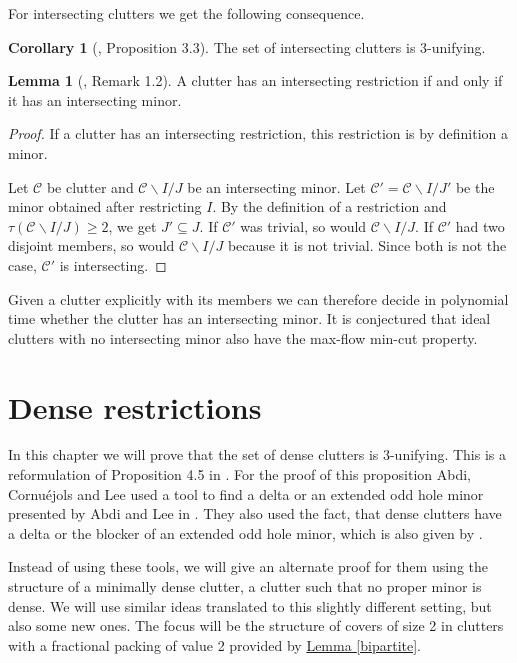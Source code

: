 \documentclass[a4paper, 12pt]{scrbook}
\theoremstyle{definition}
\newtheorem{corollary}[theorem]{Corollary}
\newtheorem{lemma}[theorem]{Lemma}
\begin{document}
   For intersecting clutters we get the following consequence.
   \begin{corollary}[\cite{restrictions}, Proposition 3.3]
       The set of intersecting clutters is 3-unifying.
   \end{corollary}

   \begin{lemma}[\cite{restrictions}, Remark 1.2]\label{intersectingminor}
       A clutter has an intersecting restriction if and only if it has an intersecting minor.
   \end{lemma}

  \begin{proof}
      If a clutter has an intersecting restriction, this restriction is by definition a minor.

      Let $\mathcal{C}$ be clutter and $\mathcal{C} \backslash I /J$ be an intersecting minor.
      Let $\mathcal{C'}=\mathcal{C} \backslash I /J'$ be the minor obtained after restricting $I$.
      By the definition of a restriction and $\tau(\mathcal{C} \backslash I /J) \geq 2$, we get $J' \subseteq J$. If $\mathcal{C'}$ was trivial, so would $\mathcal{C} \backslash I / J$.
      If $\mathcal{C'}$ had two disjoint members, so would $\mathcal{C} \backslash I /J$ because it is not trivial.
      Since both is not the case, $\mathcal{C'}$ is intersecting.
  \end{proof}

  Given a clutter explicitly with its members we can therefore decide in polynomial time whether the clutter has an intersecting minor. It is conjectured that ideal clutters with no intersecting minor also have the max-flow min-cut property\cite{restrictions}.


   \chapter{Dense restrictions}
   In this chapter we will prove that the set of dense clutters is 3-unifying.
   This is a reformulation of Proposition 4.5 in \cite{restrictions}.
   For the proof of this proposition Abdi, Cornuéjols and Lee used a tool to find a delta or an extended odd hole minor presented by Abdi and Lee in \cite{deltas}. They also used the fact, that dense clutters have a delta or the blocker of an extended odd hole minor, which is also given by \cite{deltas}.


   Instead of using these tools, we will give an alternate proof for them using the structure of a minimally dense clutter, a clutter such that no proper minor is dense.
   We will use similar ideas translated to this slightly different setting, but also some new ones.
   The focus will be the structure of covers of size 2 in clutters with a fractional packing of value 2 provided by \hyperref[bipartite]{Lemma \ref*{bipartite}}.
\end{document}
